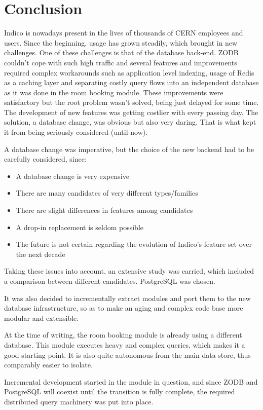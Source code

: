 \chapter{Conclusion}

Indico is nowadays present in the lives of thousands of CERN employees and users. Since the beginning, usage has grown steadily, which brought in new challenges. One of these challenges is that of the database back-end. ZODB couldn't cope with such high traffic and several features and improvements required complex workarounds such as application level indexing, usage of Redis as a caching layer and separating costly query flows into an independent database as it was done in the room booking module. These improvements were satisfactory but the root problem wasn't solved, being just delayed for some time. The development of new features was getting costlier with every passing day. The solution, a database change, was obvious but also very daring. That is what kept it from being seriously considered (until now).

A database change was imperative, but the choice of the new backend had to be carefully considered, since:
\begin{itemize}
  \item A database change is very expensive
  \item There are many candidates of very different types/families
  \item There are slight differences in features among candidates
  \item A drop-in replacement is seldom possible
  \item The future is not certain regarding the evolution of Indico's feature set over the next decade
\end{itemize}

Taking these issues into account, an extensive study was carried, which included a comparison between different candidates. PostgreSQL was chosen.

It was also decided to incrementally extract modules and port them to the new database infrastructure, so as to make an aging and complex code base more modular and extensible.

At the time of writing, the room booking module is already using a different database. This module executes heavy and complex queries, which makes it a good starting point. It is also quite autonomous from the main data store, thus comparably easier to isolate.

Incremental development started in the module in question, and since ZODB and PostgreSQL will coexist until the transition is fully complete, the required distributed query machinery was put into place.

